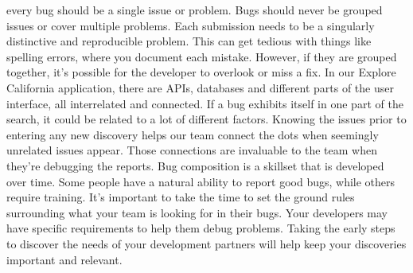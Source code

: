 every bug should be a single issue or problem. Bugs should never be grouped issues or cover multiple problems. Each submission needs to be a singularly distinctive and reproducible problem. This can get tedious with things like spelling errors, where you document each mistake. However, if they are grouped together, it's possible for the developer to overlook or miss a fix. In our Explore California application, there are APIs, databases and different parts of the user interface, all interrelated and connected. If a bug exhibits itself in one part of the search, it could be related to a lot of different factors. Knowing the issues prior to entering any new discovery helps our team connect the dots when seemingly unrelated issues appear. Those connections are invaluable to the team when they're debugging the reports. Bug composition is a skillset that is developed over time. Some people have a natural ability to report good bugs, while others require training. It's important to take the time to set the ground rules surrounding what your team is looking for in their bugs. Your developers may have specific requirements to help them debug problems. Taking the early steps to discover the needs of your development partners will help keep your discoveries important and relevant.
